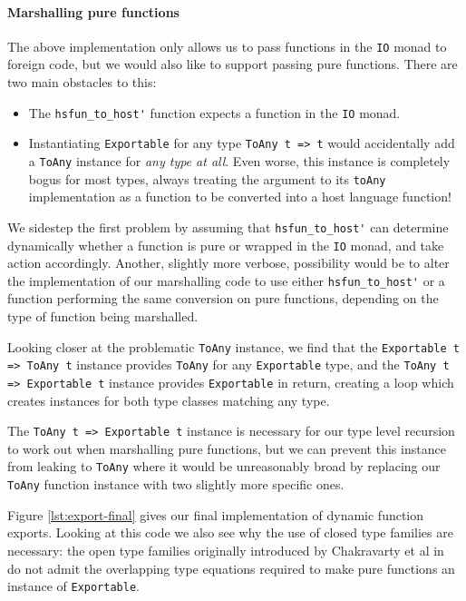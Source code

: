 \documentclass[preprint]{sigplanconf}
\begin{document}
\paragraph{Marshalling pure functions}
The above implementation only allows us to pass functions in the \lstinline!IO!
monad to foreign code, but we would also like to support passing pure
functions. There are two main obstacles to this:

\begin{itemize}
\item
  The \lstinline!hsfun_to_host'! function expects a function in the
  \lstinline!IO! monad.
\item
  Instantiating \lstinline!Exportable! for any type \lstinline!ToAny t => t!
  would accidentally add a \lstinline!ToAny! instance for
  \emph{any type at all}.
  Even worse, this instance is completely bogus for most types, always treating
  the argument to its \lstinline!toAny! implementation as a function to be
  converted into a host language function!
\end{itemize}

We sidestep the first problem by assuming that \lstinline!hsfun_to_host'!
can determine dynamically whether a function is pure or wrapped in the
\lstinline!IO! monad, and take action accordingly.
Another, slightly more verbose, possibility would be to alter the
implementation of our marshalling code to use either
\lstinline!hsfun_to_host'! or a function performing the same conversion
on pure functions, depending on the type of function being marshalled.

Looking closer at the problematic \lstinline!ToAny! instance, we find that
the \lstinline!Exportable t => ToAny t! instance provides
\lstinline!ToAny! for any \lstinline!Exportable! type, and the
\lstinline!ToAny t => Exportable t! instance provides \lstinline!Exportable! in
return, creating a loop which creates instances for both type classes
matching any type.

The \lstinline!ToAny t => Exportable t! instance is necessary
for our type level recursion to work out when marshalling pure functions,
but we can prevent this instance from leaking to \lstinline!ToAny! where it
would be unreasonably broad by replacing our \lstinline!ToAny! function
instance with two slightly more specific ones.

Figure \ref{lst:export-final} gives our final implementation of dynamic
function exports.
Looking at this code we also see why the use of closed type families are
necessary: the open type families originally introduced by Chakravarty et al
in\ \cite{typefamilies} do not admit the overlapping type equations required
to make pure functions an instance of \lstinline!Exportable!.
\end{document}
